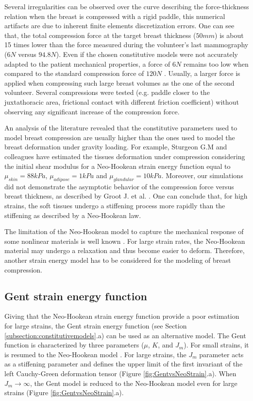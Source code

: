 Several irregularities can be observed over the curve  describing the force-thickness relation when the breast is compressed with a rigid paddle, this numerical artifacts are due to inherent finite elements discretization errors.  One can see that, the total compression force at the target breast thickness ($50mm$) is about 15 times lower than the force measured during the volunteer's last mammography ($6N$ versus $94.8N$). Even if the chosen constitutive models were not accurately adapted to the patient mechanical properties, a force of $6N$ remains too low when compared to the standard compression force of $120N$ \citep{chida_reduced_2009}. Usually, a larger force is applied when compressing such large breast volumes as the one of the second volunteer.  Several compressions were tested (e.g. paddle closer to the juxtathoracic area, frictional contact with different friction coefficient) without observing any significant increase of the compression force. 

An analysis of the literature revealed that the constitutive parameters used to model breast compression are usually higher than the ones used to model the breast deformation under gravity loading. For example, Sturgeon G.M and colleagues \citep{sturgeon_finite_element_2016} have estimated the tissues deformation under compression considering the initial shear modulus for a Neo-Hookean strain energy function equal to $\mu_{skin} = 88kPa$, $\mu_{adipose} = 1kPa$ and $\mu_{glandular}= 10kPa$. Moreover, our simulations did not demonstrate the asymptotic behavior of the compression force versus breast thickness, as described by Groot J. et al. \citep{de_pain_2015}.  One can conclude that, for high strains, the soft tissues undergo a stiffening process more rapidly than the stiffening as described by a Neo-Hookean law.

The limitation of the Neo-Hookean model to capture the mechanical response of some nonlinear materials is well known \citep{kaliske_finite_1997}. For large strain rates, the Neo-Hookean material may undergo a relaxation and thus become easier to deform. Therefore, another strain energy model has to be considered for the modeling of breast compression.

\subsection{Gent strain energy function}
Giving that the Neo-Hookean strain energy function provide a poor estimation for large strains, the Gent strain energy function (see Section \ref{subsection:constitutivemodels}.a)  can be used as an alternative model. The Gent function is characterized by three parameters ($\mu$, $K$, and $J_m$). For small strains, it is resumed to the Neo-Hookean model \citep{chagnon_comparison_2004}. For large strains, the $J_m$ parameter acts as a stiffening parameter and defines the upper limit of the first invariant of the left Cauchy-Green deformation tensor (Figure \ref{fig:GentvsNeoStrain}.a).  When $J_m \longrightarrow \infty$, the Gent model is reduced to the Neo-Hookean model even for large strains (Figure \ref{fig:GentvsNeoStrain}.a).  
 
